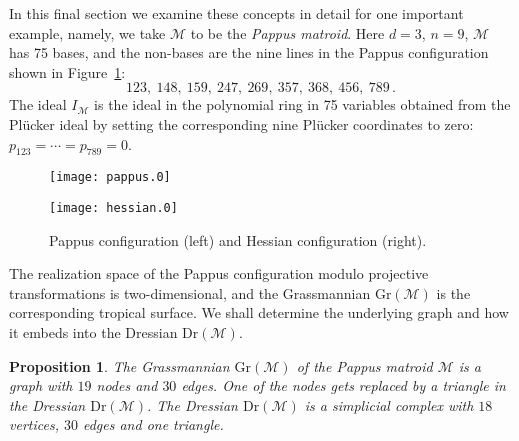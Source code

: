 \documentclass[12pt,a4paper]{amsart}
\newtheorem{prop}[thm]{Proposition}
\theoremstyle{definition}
\newcommand{\Gr}{{\mathrm{Gr}}}
\newcommand{\Dr}{{\mathrm{Dr}}}
\providecommand\cM{{\mathscr{M}}}
\begin{document}
In this final section we examine these concepts in detail for one
important example, namely, we take $\cM$ to be the \emph{Pappus
  matroid}. Here $d=3$, $n=9$, $\cM$ has 75 bases, and the non-bases
are the nine lines in the Pappus configuration shown in
Figure~\ref{fig:pappus}:
\[
123, \ 148, \ 159, \ 247, \ 269, \ 357, \ 368, \ 456, \ 789 \, .
\]
The ideal $I_\cM$ is the ideal in the polynomial ring in 75 variables
obtained from the Pl\"ucker ideal by setting the corresponding
nine Pl\"ucker coordinates to zero: $p_{123} = \cdots = p_{789} = 0$.

\begin{figure}[htb]
  \begin{minipage}[c]{.45\textwidth}\centering
    \texttt{[image: pappus.0]}
  \end{minipage}
  \begin{minipage}[c]{.45\textwidth}\centering
    \texttt{[image: hessian.0]}
  \end{minipage}
  \caption{Pappus configuration (left) and Hessian configuration (right).}
  \label{fig:pappus}
\end{figure}

The realization space of the Pappus configuration modulo projective
transformations is two-dimensional, and the Grassmannian $\Gr(\cM)$ is
the corresponding tropical surface. We shall determine the underlying
graph and how it embeds into the Dressian $\Dr(\cM)$.

\begin{prop} The Grassmannian  $\Gr(\cM)$ of the Pappus matroid 
$\cM$ is a graph with $19$ nodes and $30$ edges. One of
the nodes gets replaced by a triangle in the
Dressian  $\Dr(\cM)$.
The Dressian $\Dr(\cM)$ is a simplicial complex with $18$ vertices, $30$
edges and one triangle. 
\end{prop}
\end{document}
